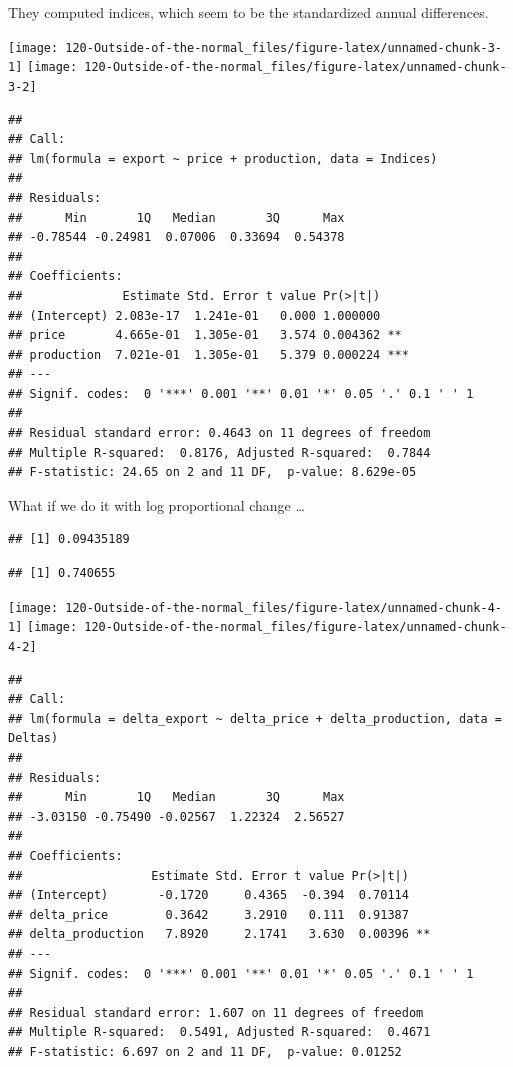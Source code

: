 \documentclass[]{tufte-book}
\begin{document}
They computed indices, which seem to be the standardized annual differences.

\texttt{[image: 120-Outside-of-the-normal\_files/figure-latex/unnamed-chunk-3-1]} \texttt{[image: 120-Outside-of-the-normal\_files/figure-latex/unnamed-chunk-3-2]}

\begin{verbatim}
## 
## Call:
## lm(formula = export ~ price + production, data = Indices)
## 
## Residuals:
##      Min       1Q   Median       3Q      Max 
## -0.78544 -0.24981  0.07006  0.33694  0.54378 
## 
## Coefficients:
##              Estimate Std. Error t value Pr(>|t|)    
## (Intercept) 2.083e-17  1.241e-01   0.000 1.000000    
## price       4.665e-01  1.305e-01   3.574 0.004362 ** 
## production  7.021e-01  1.305e-01   5.379 0.000224 ***
## ---
## Signif. codes:  0 '***' 0.001 '**' 0.01 '*' 0.05 '.' 0.1 ' ' 1
## 
## Residual standard error: 0.4643 on 11 degrees of freedom
## Multiple R-squared:  0.8176, Adjusted R-squared:  0.7844 
## F-statistic: 24.65 on 2 and 11 DF,  p-value: 8.629e-05
\end{verbatim}

What if we do it with log proportional change \ldots{}

\begin{verbatim}
## [1] 0.09435189
\end{verbatim}

\begin{verbatim}
## [1] 0.740655
\end{verbatim}

\texttt{[image: 120-Outside-of-the-normal\_files/figure-latex/unnamed-chunk-4-1]} \texttt{[image: 120-Outside-of-the-normal\_files/figure-latex/unnamed-chunk-4-2]}

\begin{verbatim}
## 
## Call:
## lm(formula = delta_export ~ delta_price + delta_production, data = Deltas)
## 
## Residuals:
##      Min       1Q   Median       3Q      Max 
## -3.03150 -0.75490 -0.02567  1.22324  2.56527 
## 
## Coefficients:
##                  Estimate Std. Error t value Pr(>|t|)   
## (Intercept)       -0.1720     0.4365  -0.394  0.70114   
## delta_price        0.3642     3.2910   0.111  0.91387   
## delta_production   7.8920     2.1741   3.630  0.00396 **
## ---
## Signif. codes:  0 '***' 0.001 '**' 0.01 '*' 0.05 '.' 0.1 ' ' 1
## 
## Residual standard error: 1.607 on 11 degrees of freedom
## Multiple R-squared:  0.5491, Adjusted R-squared:  0.4671 
## F-statistic: 6.697 on 2 and 11 DF,  p-value: 0.01252
\end{verbatim}
\end{document}
